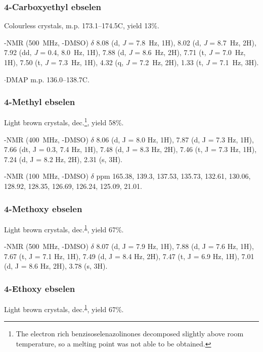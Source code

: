 \begin{refsection}
\subsubsection{4-Carboxyethyl ebselen }
Colourless crystals, m.p. 173.1--174.5\degree{}C, yield 13\%.

-NMR (500~MHz, -DMSO) $ \delta $ 8.08 (d, \textit{J} = 7.8~Hz, 1H), 8.02 (d, \textit{J} = 8.7~Hz, 2H), 7.92 (dd, \textit{J} = 0.4, 8.0~Hz, 1H), 7.88 (d, \textit{J} = 8.6~Hz, 2H), 7.71 (t, \textit{J} = 7.0~Hz, 1H), 7.50 (t, \textit{J} = 7.3~Hz, 1H), 4.32 (q, \textit{J} = 7.2~Hz, 2H), 1.33 (t, \textit{J} = 7.1~Hz, 3H).

$ \cdot $DMAP m.p. 136.0--138.7\degree{}C.


\subsubsection{4-Methyl ebselen }
Light brown crystals, dec.\footnote{\label{fn:decompose} The electron rich benzisoselenazolinones decomposed slightly above room temperature, so a melting point was not able to be obtained.}, yield 58\%.

-NMR (400~MHz, -DMSO) $ \delta $ 8.06 (d, J = 8.0 Hz, 1H), 7.87 (d, J = 7.3 Hz, 1H), 7.66 (dt, J = 0.3, 7.4 Hz, 1H), 7.48 (d, J = 8.3 Hz, 2H), 7.46 (t, J = 7.3 Hz, 1H), 7.24 (d, J = 8.2 Hz, 2H), 2.31 (s, 3H).

-NMR (100~MHz, -DMSO) $\delta$ ppm 165.38, 139.3, 137.53, 135.73, 132.61, 130.06, 128.92, 128.35, 126.69, 126.24, 125.09, 21.01.

\subsubsection{4-Methoxy ebselen }
Light brown crystals, dec.\textsuperscript{\ref{fn:decompose}}, yield 67\%.

-NMR (500~MHz, -DMSO) $ \delta $ 8.07 (d, J = 7.9 Hz, 1H), 7.88 (d, J = 7.6 Hz, 1H), 7.67 (t, J = 7.1 Hz, 1H), 7.49 (d, J = 8.4 Hz, 2H), 7.47 (t, J = 6.9 Hz, 1H), 7.01 (d, J = 8.6 Hz, 2H), 3.78 (s, 3H).

\subsubsection{4-Ethoxy ebselen }
Light brown crystals, dec.\textsuperscript{\ref{fn:decompose}}, yield 67\%.


\end{refsection}
